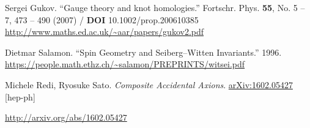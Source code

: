 \documentclass[10pt]{amsart}
\begin{document}
\begin{thebibliography}{9}
Sergei Gukov.  ``Gauge theory and knot homologies.''  Fortschr. Phys. \textbf{55}, No. 5 – 7, 473 – 490 (2007) / \textbf{DOI} 10.1002/prop.200610385  \url{http://www.maths.ed.ac.uk/~aar/papers/gukov2.pdf}


Dietmar Salamon.  ``Spin Geometry and Seiberg–Witten Invariants.''  1996.  \url{https://people.math.ethz.ch/~salamon/PREPRINTS/witsei.pdf}






Michele Redi, Ryosuke Sato. \emph{Composite Accidental Axions}. \href{arXiv:1602.05427 [hep-ph]}{arXiv:1602.05427} [hep-ph]

\url{http://arxiv.org/abs/1602.05427}


\end{thebibliography}












%
\end{document}

